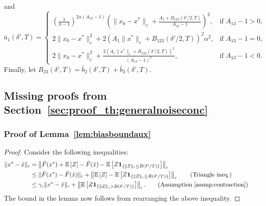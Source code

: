 \documentclass{article}
\newcommand{\lrp}[1]{\left( #1 \right)}
\newcommand{\lrs}[1]{\left[ #1 \right]}
\newcommand{\E}[1]{\mathbb{E}\lrs{#1}}
\begin{document}
and
\[\bar{a}_1(\delta', T) = \begin{cases} \lrp{\frac{1}{h-1}}^{2\alpha (A_{13}-1)} \lrp{ \|x_0 - x^*\|_c + \frac{A_1 + B_{123}(\delta'/2, T)}{A_{13}-1} }^2, &\text{if } A_{13} - 1 > 0, \\
        2\|x_0 - x^*\|^2_c + 2(A_1 \|x^*\|_c + B_{123}(\delta'/2, T))^2 \alpha^2,&\text{if } A_{13} - 1= 0,\\
        2\|x_0 - x^*\|^2_c + \frac{2(A_1 \|x^*\|_c + B_{123}(\delta'/2, T))^2}{(A_{13}- 1)^2},&\text{if } A_{13} -1 < 0.
        \end{cases}
\]
Finally, let $ B_{23}(\delta',T) = \bar{b}_2(\delta',T) + \bar{b}_3(\delta',T)$.

\subsection{Missing proofs from Section~\ref{sec:proof_th:generalnoiseconc}}
\subsubsection{Proof of Lemma~\ref{lem:biasboundaux}}\label{app:proof_lem:biasboundaux}
\begin{proof} Consider the following inequalities: 
    \begin{align*}
    \|x^* - \tilde{x}\|_c 
    &= \left\| \bar{F}(x^*) + \E{Z} - \bar{F}(\tilde{x}) - \E{Z {\bf 1}_{\{ \| Z \|_c \le B(\delta'/T)\}}} \right\|_c \\ %
    &\le \| \bar{F}(x^*)  - \bar{F}(\tilde{x})\|_c  +  \left\| \E{Z}- \E{Z {\bf 1}_{\{\|Z \|_c \le B(\delta'/T)\}}} \right\|_c \tag{Triangle ineq.}\\
    &\le \gamma_c \|x^* - \tilde{x}\|_c + \left\| \E{Z {\bf 1}_{\{\|Z\|_c > B(\delta'/T)\}}} \right\|_c.  \tag{Assumption~\ref{assmp:contraction}}
\end{align*}
The bound in the lemma now follows from rearranging the above inequality.
\end{proof}
\end{document}
